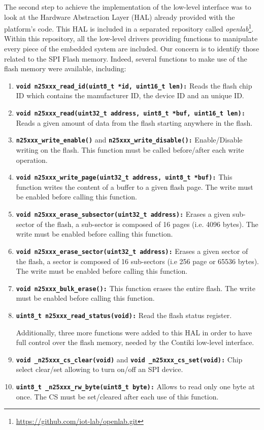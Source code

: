 The second step to achieve the implementation of the low-level interface was to look at the Hardware Abstraction Layer (HAL) already provided with the platform's code.
This HAL is included in a separated repository called \textit{openlab}\footnote{\url{https://github.com/iot-lab/openlab.git}}.
Within this repository, all the low-level drivers providing functions to manipulate every piece of the embedded system are included.
Our concern is to identify those related to the SPI Flash memory.
Indeed, several functions to make use of the flash memory were available, including:
\begin{enumerate}
	\item \texttt{\textbf{void n25xxx\_read\_id(uint8\_t *id, uint16\_t len):}} Reads the flash chip ID which contains the manufacturer ID, the device ID and an unique ID.
	\item \texttt{\textbf{void n25xxx\_read(uint32\_t address, uint8\_t *buf, uint16\_t len):}} Reads a given amount of data from the flash starting anywhere in the flash.
	\item \texttt{\textbf{n25xxx\_write\_enable()}} and \texttt{\textbf{n25xxx\_write\_disable():}} Enable/Disable writing on the flash.
	This function must be called before/after each write operation.
	\item \texttt{\textbf{void n25xxx\_write\_page(uint32\_t address, uint8\_t *buf):}} This function writes the content of a buffer to a given flash page.
	The write must be enabled before calling this function.
	\item \texttt{\textbf{void n25xxx\_erase\_subsector(uint32\_t address):}} Erases a given sub-sector of the flash, a sub-sector is composed of 16 pages (i.e. 4096 bytes).
	The write must be enabled before calling this function.
	\item \texttt{\textbf{void n25xxx\_erase\_sector(uint32\_t address):}} Erases a given sector of the flash, a sector is composed of 16 sub-sectors (i.e 256 page or 65536 bytes).
	The write must be enabled before calling this function.
	\item \texttt{\textbf{void n25xxx\_bulk\_erase():}} This function erases the entire flash.
	The write must be enabled before calling this function.
	\item \texttt{\textbf{uint8\_t n25xxx\_read\_status(void):}} Read the flash status register.
	
	Additionally, three more functions were added to this HAL in order to have full control over the flash memory, needed by the Contiki low-level interface.
	
	\item \texttt{\textbf{void \_n25xxx\_cs\_clear(void)}} and \texttt{\textbf{void \_n25xxx\_cs\_set(void):}} Chip select clear/set allowing to turn on/off an SPI device.
	\item \texttt{\textbf{uint8\_t \_n25xxx\_rw\_byte(uint8\_t byte):}} Allows to read only one byte at once.
	The CS must be set/cleared after each use of this function.
\end{enumerate}
